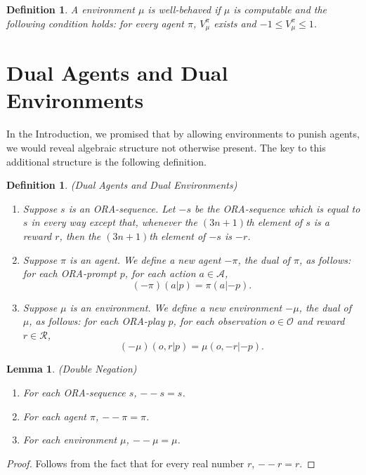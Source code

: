 \documentclass{article}
\newtheorem{definition}[theorem]{Definition}
\newtheorem{lemma}[theorem]{Lemma}
\begin{document}
\begin{definition}
    A environment $\mu$ is \emph{well-behaved} if $\mu$ is computable and the following
    condition holds: for every agent $\pi$, $V^\pi_\mu$ exists and
    $-1\leq V^\pi_\mu\leq 1$.
\end{definition}

\section{Dual Agents and Dual Environments}
\label{dualsection}

In the Introduction, we promised that by allowing environments to punish agents,
we would reveal algebraic structure not otherwise present. The key to this additional
structure is the following definition.

\begin{definition}
(Dual Agents and Dual Environments)
\begin{enumerate}
    \item
    Suppose $s$ is an ORA-sequence. Let $-s$
    be the ORA-sequence which is equal to $s$ in every way except that,
    whenever the $(3n+1)$th element of $s$ is a reward $r$,
    then the $(3n+1)$th element of $-s$ is $-r$.
    \item
    Suppose $\pi$ is an agent.
    We define a new agent $-\pi$, the \emph{dual} of $\pi$,
    as follows:
    for each ORA-prompt $p$, for each action $a\in\mathcal A$,
    \[(-\pi)(a|p)=\pi(a|{-p}).\]
    \item
    Suppose $\mu$ is an environment.
    We define a new environment $-\mu$, the \emph{dual} of $\mu$,
    as follows:
    for each ORA-play $p$, for each observation $o\in\mathcal O$
    and reward $r\in\mathcal R$,
    \[(-\mu)(o,r|p)=\mu(o,-r|{-p}).\]
\end{enumerate}
\end{definition}

\begin{lemma}
\label{doublesubtractionlemma}
(Double Negation)
    \begin{enumerate}
        \item For each ORA-sequence $s$, $--s=s$.
        \item For each agent $\pi$, $--\pi=\pi$.
        \item For each environment $\mu$, $--\mu=\mu$.
    \end{enumerate}
\end{lemma}

\begin{proof}
    Follows from the fact that for every real number $r$, $--r=r$.
\end{proof}
\end{document}
